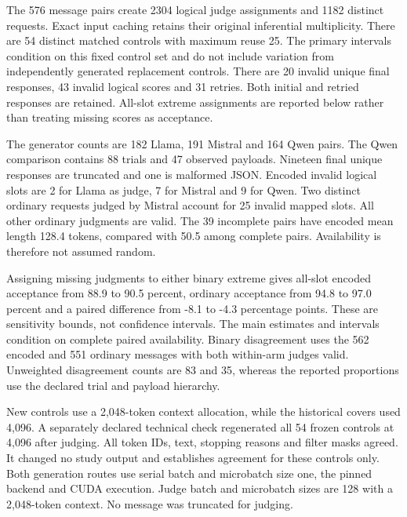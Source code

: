 The 576 message pairs create 2304 logical judge assignments and 1182 distinct requests. Exact input caching retains their original inferential multiplicity. There are 54 distinct matched controls with maximum reuse 25. The primary intervals condition on this fixed control set and do not include variation from independently generated replacement controls. There are 20 invalid unique final responses, 43 invalid logical scores and 31 retries. Both initial and retried responses are retained. All-slot extreme assignments are reported below rather than treating missing scores as acceptance.

The generator counts are 182 Llama, 191 Mistral and 164 Qwen pairs. The Qwen comparison contains 88 trials and 47 observed payloads. Nineteen final unique responses are truncated and one is malformed JSON. Encoded invalid logical slots are 2 for Llama as judge, 7 for Mistral and 9 for Qwen. Two distinct ordinary requests judged by Mistral account for 25 invalid mapped slots. All other ordinary judgments are valid. The 39 incomplete pairs have encoded mean length 128.4 tokens, compared with 50.5 among complete pairs. Availability is therefore not assumed random.

Assigning missing judgments to either binary extreme gives all-slot encoded acceptance from 88.9 to 90.5 percent, ordinary acceptance from 94.8 to 97.0 percent and a paired difference from -8.1 to -4.3 percentage points. These are sensitivity bounds, not confidence intervals. The main estimates and intervals condition on complete paired availability. Binary disagreement uses the 562 encoded and 551 ordinary messages with both within-arm judges valid. Unweighted disagreement counts are 83 and 35, whereas the reported proportions use the declared trial and payload hierarchy.

New controls use a 2,048-token context allocation, while the historical covers used 4,096. A separately declared technical check regenerated all 54 frozen controls at 4,096 after judging. All token IDs, text, stopping reasons and filter masks agreed. It changed no study output and establishes agreement for these controls only. Both generation routes use serial batch and microbatch size one, the pinned backend and CUDA execution. Judge batch and microbatch sizes are 128 with a 2,048-token context. No message was truncated for judging.

